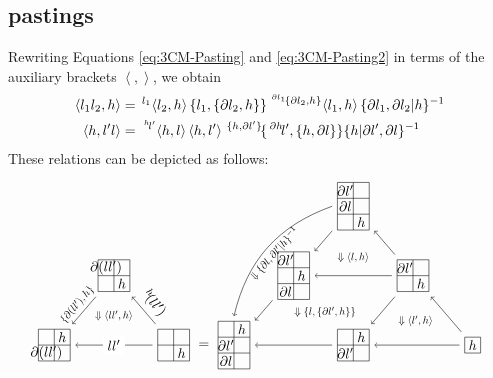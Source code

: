 \documentclass[11pt, reqno]{amsart} %
\newcommand{\act}[1]{\,\sp{#1}\!}
\newcommand{\strrect}[3][]{
  \begin{scope}[every node/.append style={overlay},#1]
    \foreach \x [count=\i] in {#3}{
      \ifx\x\empty
      \else
        \pgfmathsetmacro{\modResult}{mod(\i-1, #2)}
        \pgfmathsetmacro{\quotResult}{(\i-\modResult-1)/#2}
        \node at (\modResult,-\quotResult) {\x};
      \fi
    }
    \foreach \x in {0,1,...,#2}{
      \draw ({-1/2+\x},{1/2})--({-1/2+\x},{-#2+1/2});
      \draw ({-1/2},{1/2-\x})--({#2-1/2},{1/2-\x});
    }
  \end{scope}
}
\newcommand{\strsquare}[4][]{
  \begin{scope}[every node/.append style={overlay},#1]
    \foreach \x [count=\i] in {#4}{
      \ifx\x\empty
      \else
        \pgfmathsetmacro{\modResult}{mod(\i-1, #2)}
        \pgfmathsetmacro{\quotResult}{(\i-\modResult-1)/#2}
        \node at (\modResult,-\quotResult) {\x};
      \fi
    }
    \foreach \x in {0,1,...,#2}{
      \draw ({-1/2+\x},{1/2})--({-1/2+\x},{-#3+1/2});
    }
    \foreach \y in {0,1,...,#3}{
      \draw ({-1/2},{1/2-\y})--({#2-1/2},{1/2-\y});
    }
  \end{scope}
}
\theoremstyle{definition}
\theoremstyle{remark}
\numberwithin{equation}{section}
\begin{document}
\subsection{pastings}
Rewriting Equations \eqref{eq:3CM-Pasting} and \eqref{eq:3CM-Pasting2} in terms of the auxiliary brackets $\left<,\right>$, we obtain
\begin{align}
  \label{eq:3CM-aux-Pasting1}
  \left<l_1l_2,h\right> &= \act{l_1}\left<l_2,h\right>\{l_1,\{\partial l_2,h\}\}\act{\act{\partial l_1}\{\partial l_2,h\}}\left<l_1,h\right>\{\partial l_1,\partial l_2|h\}^{-1} \\
  \label{eq:3CM-aux-Pasting2}
  \left<h,l'l\right> &= \act{\act{h}l'}\left<h,l\right>\left<h,l'\right>\act{\{h,\partial l'\}}\{\act{\partial h}l',\{h,\partial l\}\}\{h|\partial l',\partial l\}^{-1}
\end{align}
These relations can be depicted as follows:
\begin{align*}
  \begin{tikzpicture}[baseline=-2pt]
    \node (A) at (1.5,0) {\tikz[baseline=-2pt,scale=.4]{\strrect{2}{,,,$h$}}};
    \node (B) at (0,1.75) {\tikz[baseline=-2pt,scale=.4]{\strrect{2}{$\partial (ll')$,,,$h$}}};
    \node (C) at (-1.5,0) {\tikz[baseline=-2pt,scale=.4]{\strrect{2}{,$h$,$\partial (ll')$,}}};
    \draw [->] (A) to node [anchor=south,sloped] {$\act{h}(ll')$} (B);
    \draw [->] (B) to node [anchor=south,sloped,transform shape,scale=.75] {$\{\partial (ll'),h\}$} (C);
    \draw [->] (A) to node [fill=white] (D) {$ll'$} (C);
    \path (B) to node [transform shape,scale=.75] {$\Downarrow \left<ll',h\right>$} (D);
  \end{tikzpicture}
  =
  \begin{tikzpicture}[baseline=-2pt]
    \node (A) at (3,0) {\tikz[baseline=-2pt,scale=.4]{\strrect{1}{$h$}}};
    \node (B) at (1.5,1.75) {\tikz[baseline=-2pt,scale=.4]{\strrect{2}{$\partial l'$,,,$h$}}};
    \node (C1) at (0,3.5) {\tikz[baseline=-2pt,scale=.4]{\strsquare{2}{3}{$\partial l'$,,$\partial l$,,,$h$}}};
    \node (C2) at (0,0) {\tikz[baseline=-2pt,scale=.4]{\strrect{2}{,$h$,$\partial l'$,}}};
    \node (D) at (-1.5,1.75) {\tikz[baseline=-2pt,scale=.4]{\strsquare{2}{3}{$\partial l'$,,,$h$,$\partial l$,}}};
    \node (E) at (-3,0) {\tikz[baseline=-2pt,scale=.4]{\strsquare{2}{3}{,$h$,$\partial l'$,,$\partial l$,}}};
    \draw [->] (A) to (B);
    \draw [->] (B) to (C1);
    \draw [->] (C1) to (D);
    \draw [->] (D) to (E);
    \draw [->] (A) to coordinate (F) (C2);
    \draw [->] (C2) to (E);
    \draw [->] (B) to (D);
    \draw [->] (B) to (C2);
    \draw [->,bend right=1cm] (C1.west) to node [transform shape,scale=.75,sloped,anchor=north] {$\Downarrow \{\partial l,\partial l'|h\}^{-1}$} (E.north);
    \path (D) to node [transform shape,scale=.75] {$\Downarrow \{l,\{\partial l',h\}\}$} (C2);
    \path (C1) to node [pos=1/4,transform shape,scale=.75] {$\Downarrow \left<l,h\right>$} (C2);
    \path (B) to node [transform shape,scale=.75] {$\Downarrow \left<l',h\right>$} (F);
  \end{tikzpicture}
\end{align*}
\end{document}

